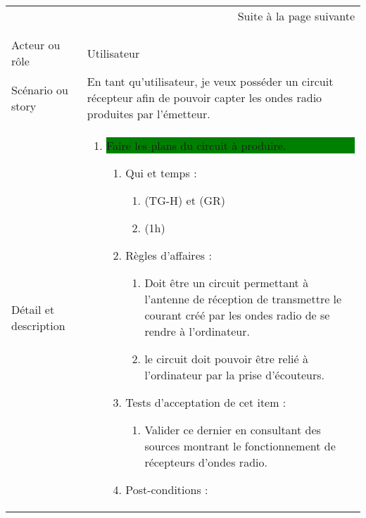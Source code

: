 \begin{longtable}{|l|p{}|}
\multicolumn{2}{r}{Suite à la page suivante} \\
\endfoot

\multicolumn{2}{r}{} \\
\endlastfoot

\hline
    \rowcolor{Gray}
    \multicolumn{2}{|l|}{1} \\
\hline
    Acteur ou rôle & Utilisateur \\
\hline
    Scénario ou story & En tant qu’utilisateur, je veux posséder un circuit
    récepteur afin de pouvoir capter les ondes radio produites par l’émetteur. \\
\hline
    Détail et description &
        \begin{enumerate}[label*=\arabic*.]
        \item\colorbox{Green}{\parbox{13cm}{ Faire les plans du circuit à produire.}}
            \begin{enumerate}[label*=\arabic*.]
                    \item Qui et temps :
                    \begin{enumerate}[label*=\arabic*.]
                        \item (TG-H) et (GR)
                        \item (1h)
                    \end{enumerate}
                    \item Règles d’affaires :
                    \begin{enumerate}[label*=\arabic*.]
                        \item Doit être un circuit permettant à l'antenne de réception de transmettre le courant créé par les ondes radio de se rendre à l'ordinateur.
                        \item le circuit doit pouvoir être relié à l'ordinateur par la prise d'écouteurs.
                    \end{enumerate}
                    \item Tests d'acceptation de cet item :
                    \begin{enumerate}[label*=\arabic*.]
                        \item Valider ce dernier en consultant des sources montrant le fonctionnement de récepteurs d'ondes radio. 
                    \end{enumerate}
                    \item Post-conditions :

\end{enumerate}
\end{enumerate}
\end{longtable}
